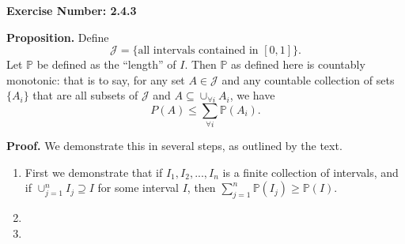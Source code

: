 \documentclass{article}
\begin{document}
\noindent \textbf{Exercise Number: 2.4.3}  %

\bigskip 

\noindent \textbf{Proposition.} Define \[\mathcal{J} = \{\text{all intervals contained in } [0,1]\}.\] Let $\mathbb{P}$ be defined as the ``length'' of $I$. Then $\mathbb{P}$ as defined here is countably monotonic: that is to say, for any set $A \in \mathcal{J}$ and any countable collection of sets $\{A_i\}$ that are all subsets of $\mathcal{J}$ and $A \subseteq \cup_{\forall i} A_i$, we have \[P(A) \leq \sum_{\forall i} \mathbb{P}(A_i).\]

\bigskip

\noindent \textbf{Proof.} We demonstrate this in several steps, as outlined by the text.

\begin{enumerate}

\item First we demonstrate that if $I_1, I_2, ..., I_n$ is a finite collection of intervals, and if
$\cup _{j = 1}^n I_j \supseteq I$ for some interval $I$, then $\sum_{j = 1}^n \mathbb{P}(I_j) \geq \mathbb{P}(I)$.

\item 

\item

\end{enumerate}
\end{document}

